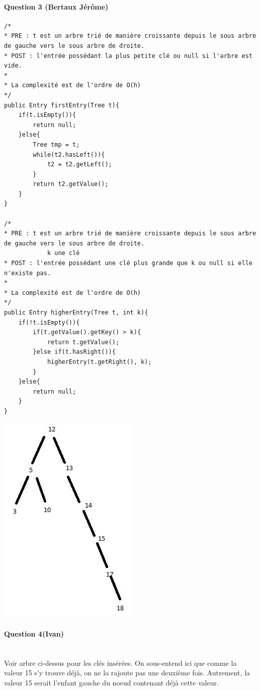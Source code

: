 \documentclass[a4paper]{article}
\begin{document}
\paragraph*{Question 3 (Bertaux Jérôme)}
\begin{verbatim}
/*
* PRE : t est un arbre trié de manière croissante depuis le sous arbre de gauche vers le sous arbre de droite.
* POST : l'entrée possédant la plus petite clé ou null si l'arbre est vide.
* 
* La complexité est de l'ordre de O(h)
*/
public Entry firstEntry(Tree t){
	if(t.isEmpty()){
		return null;
	}else{
		Tree tmp = t;
		while(t2.hasLeft()){
			t2 = t2.getLeft();		
		}
		return t2.getValue();	
	}
}

/*
* PRE : t est un arbre trié de manière croissante depuis le sous arbre de gauche vers le sous arbre de droite.
			k une clé
* POST : l'entrée possédant une clé plus grande que k ou null si elle n'existe pas.
* 
* La complexité est de l'ordre de O(h)
*/
public Entry higherEntry(Tree t, int k){
	if(!t.isEmpty()){
		if(t.getValue().getKey() > k){
			return t.getValue();		
		}else if(t.hasRight()){
			higherEntry(t.getRight(), k);		
		}	
	}else{
		return null;	
	}
}
\end{verbatim}
\newpage


\includegraphics[scale=0.5]{arbre.png}
\paragraph*{Question 4(Ivan)}
\\

Voir arbre ci-dessus pour les clés insérées. On sous-entend ici que comme la valeur 15 s'y trouve déjà, on ne la rajoute pas une deuxième fois. Autrement, la valeur 15 serait l'enfant gauche du noeud contenant déjà cette valeur. 
\\
\end{document}
